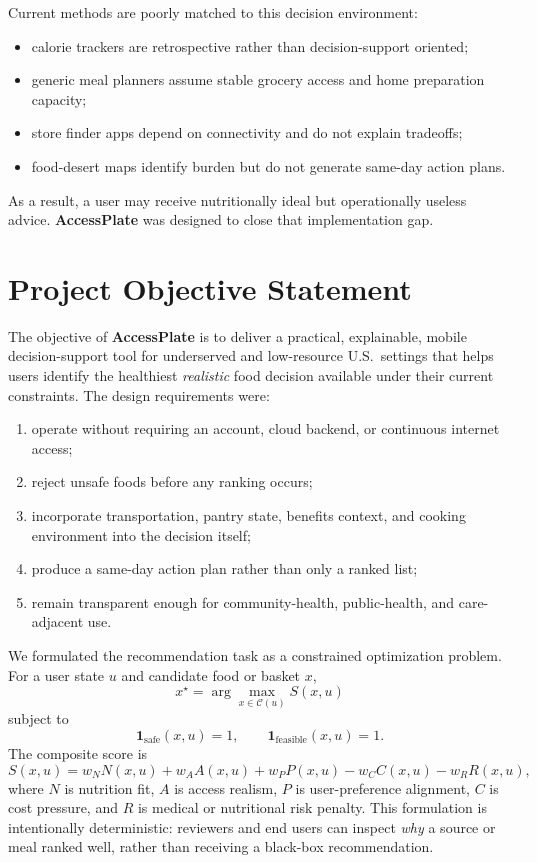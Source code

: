 \documentclass[11pt,letterpaper]{article}
\newcommand{\app}{\textbf{AccessPlate}}
\begin{document}
Current methods are poorly matched to this decision environment:
\begin{itemize}
\item calorie trackers are retrospective rather than decision-support oriented;
\item generic meal planners assume stable grocery access and home preparation capacity;
\item store finder apps depend on connectivity and do not explain tradeoffs;
\item food-desert maps identify burden but do not generate same-day action plans.
\end{itemize}

As a result, a user may receive nutritionally ideal but operationally useless advice. \app{} was designed to close that implementation gap.

\section{Project Objective Statement}
The objective of \app{} is to deliver a practical, explainable, mobile decision-support tool for underserved and low-resource U.S.\ settings that helps users identify the healthiest \emph{realistic} food decision available under their current constraints. The design requirements were:
\begin{enumerate}
\item operate without requiring an account, cloud backend, or continuous internet access;
\item reject unsafe foods before any ranking occurs;
\item incorporate transportation, pantry state, benefits context, and cooking environment into the decision itself;
\item produce a same-day action plan rather than only a ranked list;
\item remain transparent enough for community-health, public-health, and care-adjacent use.
\end{enumerate}

We formulated the recommendation task as a constrained optimization problem. For a user state \(u\) and candidate food or basket \(x\),
\begin{equation}
x^\star = \arg\max_{x \in \mathcal{C}(u)} S(x,u)
\end{equation}
subject to
\begin{equation}
\mathbf{1}_{\text{safe}}(x,u)=1,\qquad \mathbf{1}_{\text{feasible}}(x,u)=1.
\end{equation}
The composite score is
\begin{equation}
S(x,u)=w_NN(x,u)+w_AA(x,u)+w_PP(x,u)-w_CC(x,u)-w_RR(x,u),
\end{equation}
where \(N\) is nutrition fit, \(A\) is access realism, \(P\) is user-preference alignment, \(C\) is cost pressure, and \(R\) is medical or nutritional risk penalty. This formulation is intentionally deterministic: reviewers and end users can inspect \emph{why} a source or meal ranked well, rather than receiving a black-box recommendation.
\end{document}
